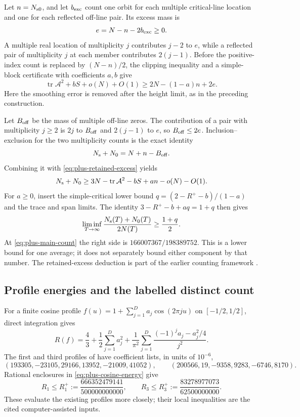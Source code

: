 \documentclass[11pt,reqno]{amsart}
\numberwithin{equation}{section}
\begin{document}
Let $n=N_{\rm s0}$, and let $b_{\rm exc}$ count one orbit for each
multiple critical-line location and one for each reflected off-line
pair. Its excess mass is
\[
 e=N-n-2b_{\rm exc}\ge0.
\]
A multiple real location of multiplicity $j$ contributes $j-2$ to
$e$, while a reflected pair of multiplicity $j$ at each member
contributes $2(j-1)$. Before the positive-index count is replaced
by $(N-n)/2$, the clipping inequality and a simple-block certificate
with coefficients $a,b$ give
\begin{equation}
 \operatorname{tr}\mathcal A^2+bS+o(N)+O(1)
 \ge 2N-(1-a)n+2e.
 \label{eq:plus-retained-excess}
\end{equation}
Here the smoothing error is removed after the height limit, as in
the preceding construction.

Let $B_{\rm off}$ be the mass of multiple off-line zeros.
The contribution of a pair with multiplicity $j\ge2$ is $2j$
to $B_{\rm off}$ and $2(j-1)$ to $e$, so $B_{\rm off}\le2e$.
Inclusion--exclusion for the two multiplicity counts is the exact identity
\[
 N_{\rm s}+N_0=N+n-B_{\rm off}.
\]
Combining it with \eqref{eq:plus-retained-excess} yields
\[
 N_{\rm s}+N_0
 \ge 3N-\operatorname{tr}\mathcal A^2-bS+an-o(N)-O(1).
\]
For $a\ge0$, insert the simple-critical lower bound
$q=(2-R^+-b)/(1-a)$ and the trace and span limits. The identity
$3-R^+-b+aq=1+q$ then gives
\begin{equation}
 \liminf_{T\to\infty}\frac{N_{\rm s}(T)+N_0(T)}{2N(T)}
 \ge\frac{1+q}{2}.
 \label{eq:plus-average-transfer}
\end{equation}
At \eqref{eq:plus-main-count} the right side is
$166007367/198389752$. This is a lower bound for one average;
it does not separately bound either component by that number.
The retained-excess deduction is part of the earlier counting
framework \cite{ChandruP6,Knausgard2026}.

\subsection{Profile energies and the labelled distinct count}

For a finite cosine profile
$f(u)=1+\sum_{j=1}^D a_j\cos(2\pi ju)$ on $[-1/2,1/2]$,
direct integration gives
\begin{equation}
 R(f)=\frac43+\frac12\sum_{j=1}^D a_j^2+
 \frac1{\pi^2}\sum_{j=1}^D
       \frac{(-1)^ja_j-a_j^2/4}{j^2}.
 \label{eq:plus-cosine-energy}
\end{equation}
The first and third profiles of \cite{Knausgard2026} have coefficient
lists, in units of $10^{-6}$,
\[
 (193305,-23105,29166,13952,-21009,41052),\qquad
 (200566,19,-9358,9283,-6746,8170).
\]
Rational enclosures in \eqref{eq:plus-cosine-energy} give
\begin{equation}
 R_1\le R_1^+:=\frac{666352479141}{500000000000},\qquad
 R_3\le R_3^+:=\frac{83278977073}{62500000000}.
 \label{eq:plus-other-energy-caps}
\end{equation}
These evaluate the existing profiles more closely; their local
inequalities are the cited computer-assisted inputs.
\end{document}
